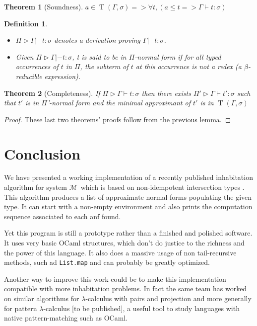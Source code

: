 \documentclass{article}
\DeclareMathOperator{\iT}{T}
\newtheorem*{Def*}{Definition}
\newtheorem*{Th*}{Theorem}
\def\sysm{system $\mathcal{M}$}
\begin{document}
\begin{Th*}[Soundness]
    $a \in \iT(\Gamma, \sigma) => \forall t, (a \leq t => \Gamma \vdash t : \sigma)$
\end{Th*}

\begin{Def*}
\begin{itemize}
\item $\Pi \triangleright \Gamma |- t : \sigma$ denotes a derivation proving $ \Gamma |- t : \sigma$.
\item Given $\Pi \triangleright \Gamma |- t : \sigma$, t is said to be in $\Pi$-normal form if for all typed occurrences of $t$ in $\Pi$, the subterm of $t$ at this occurrence is not a redex (a $\beta$-reducible expression).
\end{itemize}

\end{Def*}

\begin{Th*}[Completeness]
    If $\Pi \triangleright \Gamma \vdash t : \sigma$ then there exists $\Pi ' \triangleright \Gamma \vdash t' : \sigma$ such that $t'$ is in \emph{$\Pi$'-normal form} and the minimal approximant of $t'$ is in $\iT(\Gamma, \sigma)$
\end{Th*}
 
 \begin{proof}
 These last two theorems' proofs follow from the previous lemma.
 \end{proof}


\section{Conclusion}
We have presented a working implementation of a recently published inhabitation algorithm for \sysm\ which is based on non-idempotent intersection types \cite{Kes}. This algorithm produces a list of approximate normal forms populating the given type. It can start with a non-empty environment and also prints the computation sequence associated to each anf found.

Yet this program is still a prototype rather than a finished and polished software. It uses very basic OCaml structures, which don't do justice to the richness and the power of this language. It also does a massive usage of non tail-recursive methods, such ad \texttt{List.map} and can probably be greatly optimized.

Another way to improve this work could be to make this implementation compatible with more inhabitation problems. In fact the same team has worked on similar algorithms for $\lambda$-calculus with pairs and projection \cite{Kes} and more generally for pattern $\lambda$-calculus [to be published], a useful tool to study languages with native pattern-matching such as OCaml.


\end{document}

